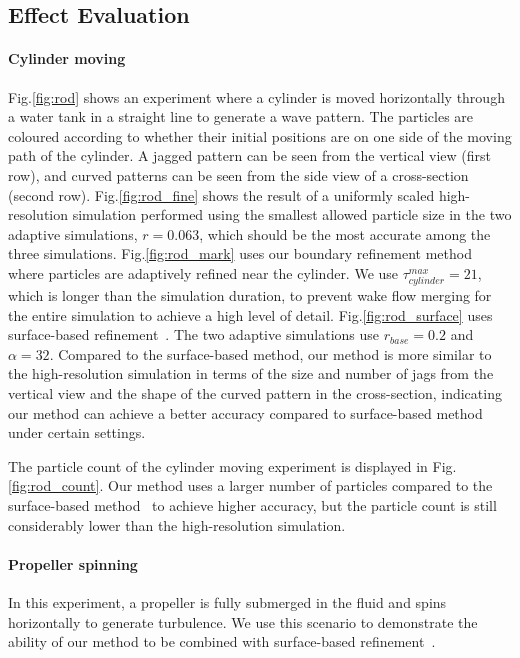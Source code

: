 \documentclass[VANCOUVER,STIX1COL]{WileyNJD-v2}
\begin{document}
\subsection{Effect Evaluation}


\paragraph{Cylinder moving}

Fig.\ref{fig:rod} shows an experiment where a cylinder is moved horizontally through a water tank in a straight line to generate a wave pattern. The particles are coloured according to whether their initial positions are on one side of the moving path of the cylinder. A jagged pattern can be seen from the vertical view (first row), and curved patterns can be seen from the side view of a cross-section (second row). Fig.\ref{fig:rod_fine} shows the result of a uniformly scaled high-resolution simulation performed using the smallest allowed particle size in the two adaptive simulations, $r = 0.063$, which should be the most accurate among the three simulations. Fig.\ref{fig:rod_mark} uses our boundary refinement method where particles are adaptively refined near the cylinder. We use $\tau_{cylinder}^{max} = 21$, which is longer than the simulation duration, to prevent wake flow merging for the entire simulation to achieve a high level of detail. Fig.\ref{fig:rod_surface} uses surface-based refinement~\cite{Winchenbach17}. The two adaptive simulations use $r_{base} = 0.2$ and $\alpha = 32$. Compared to the surface-based method, our method is more similar to the high-resolution simulation in terms of the size and number of jags from the vertical view and the shape of the curved pattern in the cross-section, indicating our method can achieve a better accuracy compared to surface-based method~\cite{Winchenbach17} under certain settings.

The particle count of the cylinder moving experiment is displayed in Fig.\ref{fig:rod_count}. Our method uses a larger number of particles compared to the surface-based method~\cite{Winchenbach17} to achieve higher accuracy, but the particle count is still considerably lower than the high-resolution simulation.

\paragraph{Propeller spinning}

In this experiment, a propeller is fully submerged in the fluid and spins horizontally to generate turbulence. We use this scenario to demonstrate the ability of our method to be combined with surface-based refinement~\cite{Winchenbach17}.
\end{document}
